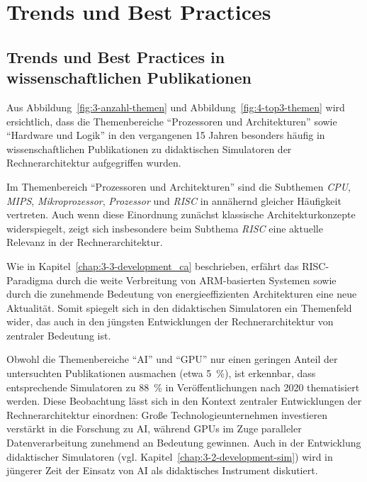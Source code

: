 \section{Trends und Best Practices}


\subsection{Trends und Best Practices in wissenschaftlichen Publikationen}

Aus Abbildung~\ref{fig:3-anzahl-themen} und Abbildung~\ref{fig:4-top3-themen} wird ersichtlich, dass die Themenbereiche \enquote{Prozessoren und Architekturen} sowie \enquote{Hardware und Logik} in den vergangenen 15 Jahren besonders häufig in wissenschaftlichen Publikationen zu didaktischen Simulatoren der Rechnerarchitektur aufgegriffen wurden.  

Im Themenbereich \enquote{Prozessoren und Architekturen} sind die Subthemen \textit{CPU}, \textit{MIPS}, \textit{Mikroprozessor}, \textit{Prozessor} und \textit{RISC} in annähernd gleicher Häufigkeit vertreten. Auch wenn diese Einordnung zunächst klassische Architekturkonzepte widerspiegelt, zeigt sich insbesondere beim Subthema \textit{RISC} eine aktuelle Relevanz in der Rechnerarchitektur.  

Wie in Kapitel~\ref{chap:3-3-development_ca} beschrieben, erfährt das \ac{RISC}-Paradigma durch die weite Verbreitung von ARM-basierten Systemen sowie durch die zunehmende Bedeutung von energieeffizienten Architekturen eine neue Aktualität. Somit spiegelt sich in den didaktischen Simulatoren ein Themenfeld wider, das auch in den jüngsten Entwicklungen der Rechnerarchitektur von zentraler Bedeutung ist.


Obwohl die Themenbereiche \enquote{AI} und \enquote{GPU} nur einen geringen Anteil der untersuchten Publikationen ausmachen (etwa 5~\%), ist erkennbar, dass entsprechende Simulatoren zu 88~\% in Veröffentlichungen nach 2020 thematisiert werden. Diese Beobachtung lässt sich in den Kontext zentraler Entwicklungen der Rechnerarchitektur einordnen: Große Technologieunternehmen investieren verstärkt in die Forschung zu \ac{AI}, während GPUs im Zuge paralleler Datenverarbeitung zunehmend an Bedeutung gewinnen. Auch in der Entwicklung didaktischer Simulatoren (vgl. Kapitel~\ref{chap:3-2-development-sim}) wird in jüngerer Zeit der Einsatz von \ac{AI} als didaktisches Instrument diskutiert.

